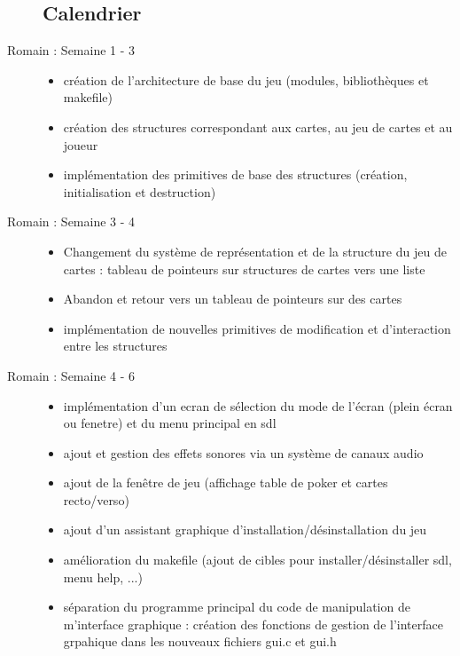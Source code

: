 \documentclass[12pt,a4paper]{article}
\begin{document}
\begin{description}
\subsection{Calendrier}
\item[Romain : Semaine 1 - 3]
{
\begin{itemize}
\item création de l'architecture de base du jeu (modules, bibliothèques et makefile)
\item création des structures correspondant aux cartes, au jeu de cartes et au joueur
\item implémentation des primitives de base des structures (création, initialisation et destruction)
\end{itemize}
}
\item[Romain : Semaine 3 - 4]
{
\begin{itemize}
\item Changement du système de représentation et de la structure du jeu de cartes : tableau de pointeurs sur structures de cartes vers une liste
\item Abandon et retour vers un tableau de pointeurs sur des cartes
\item implémentation de nouvelles primitives de modification et d'interaction entre les structures
\end{itemize}
}
\item[Romain : Semaine 4 - 6]
{
\begin{itemize}
\item implémentation d'un ecran de sélection du mode de l'écran (plein écran ou fenetre) et du menu principal en sdl 
\item ajout et gestion des effets sonores via un système de canaux audio
\item ajout de la fenêtre de jeu (affichage table de poker et cartes recto/verso)
\item ajout d'un assistant graphique d'installation/désinstallation du jeu
\item amélioration du makefile (ajout de cibles pour installer/désinstaller sdl, menu help, ...)
\item séparation du programme principal du code de manipulation de m'interface graphique : création des fonctions de gestion de l'interface grpahique dans les nouveaux fichiers gui.c et gui.h
\end{itemize}
}


\end{description}
\end{document}
